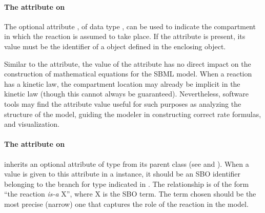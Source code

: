 



\paragraph{The  attribute on }
\label{sec:reaction-compartment}

The optional attribute , of data type
, can be used to indicate the compartment in
which the reaction is assumed to take place.  If the attribute is
present, its value must be the identifier of a \Compartment object
defined in the enclosing \Model object.

Similar to the  attribute, the value of the
 attribute has no direct impact on the
construction of mathematical equations for the SBML model.  When a
reaction has a kinetic law, the compartment location may already
be implicit in the kinetic law (though this cannot always be
guaranteed).  Nevertheless, software tools may find the
 attribute value useful for such purposes as
analyzing the structure of the model, guiding the modeler in
constructing correct rate formulas, and visualization.


\paragraph{The  attribute on }
\label{sec:reaction-sboterm}

\Reaction inherits an optional 
attribute of type  from its parent
class \SBase (see 
and ).  When a value is given to this
attribute in a  \Reaction instance, it should be an
SBO identifier belonging to the branch for type  \Reaction  
indicated in .  The relationship is
of the form ``the reaction \emph{is-a} X'', where X is
the SBO term.  The term chosen should be the most precise (narrow)
one that captures the role of the reaction in the model.

